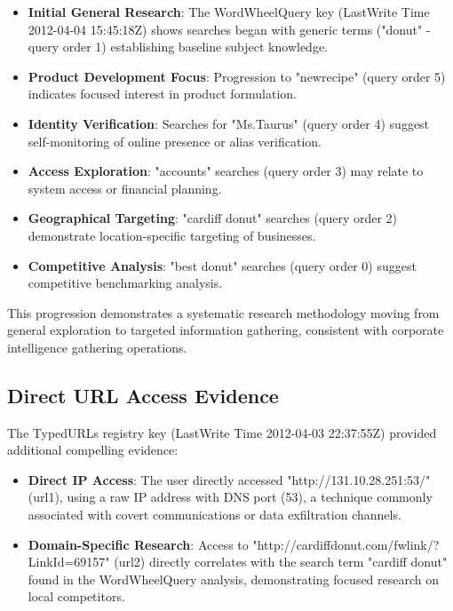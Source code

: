 \begin{itemize}
    \item \textbf{Initial General Research}: The WordWheelQuery key (LastWrite Time 2012-04-04 15:45:18Z) shows searches began with generic terms ("donut" - query order 1) establishing baseline subject knowledge.
    
    \item \textbf{Product Development Focus}: Progression to "newrecipe" (query order 5) indicates focused interest in product formulation.
    
    \item \textbf{Identity Verification}: Searches for "Ms.Taurus" (query order 4) suggest self-monitoring of online presence or alias verification.
    
    \item \textbf{Access Exploration}: "accounts" searches (query order 3) may relate to system access or financial planning.
    
    \item \textbf{Geographical Targeting}: "cardiff donut" searches (query order 2) demonstrate location-specific targeting of businesses.
    
    \item \textbf{Competitive Analysis}: "best donut" searches (query order 0) suggest competitive benchmarking analysis.
\end{itemize}

This progression demonstrates a systematic research methodology moving from general exploration to targeted information gathering, consistent with corporate intelligence gathering operations.

\subsection{Direct URL Access Evidence}
The TypedURLs registry key (LastWrite Time 2012-04-03 22:37:55Z) provided additional compelling evidence:

\begin{itemize}
    \item \textbf{Direct IP Access}: The user directly accessed "http://131.10.28.251:53/" (url1), using a raw IP address with DNS port (53), a technique commonly associated with covert communications or data exfiltration channels.
    
    \item \textbf{Domain-Specific Research}: Access to "http://cardiffdonut.com/fwlink/?LinkId=69157" (url2) directly correlates with the search term "cardiff donut" found in the WordWheelQuery analysis, demonstrating focused research on local competitors.
\end{itemize}

